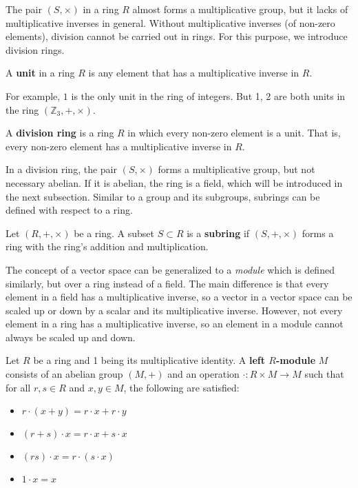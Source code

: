 \documentclass[../main.tex]{subfiles}
\begin{document}
The pair $(S, \times)$ in a ring $R$ almost forms a multiplicative group, but it lacks of multiplicative inverses in general. Without multiplicative inverses (of non-zero elements), division cannot be carried out in rings. For this purpose, we introduce division rings. 
\begin{definition}
A \textbf{unit} in a ring $R$ is any element that has a multiplicative inverse in $R$.
\end{definition}
For example, $1$ is the only unit in the ring of integers. But 1, 2 are both units in the ring $(\mathbb{Z}_3,+,\times)$. 

\begin{definition}
A \textbf{division ring}\reversemarginpar
{}
 is a ring $R$ in which every non-zero element is a unit. That is, every non-zero element has a multiplicative inverse in $R$. 
\end{definition}

In a division ring, the pair $(S, \times)$ forms a multiplicative group, but not necessary abelian. If it is abelian, the ring is a field, which will be introduced in the next subsection. Similar to a group and its subgroups, subrings can be defined with respect to a ring. 

\begin{definition}
Let $(R,+,\times)$ be a ring. A subset $S \subset R$ is a \textbf{subring} if $(S,+,\times)$ forms a ring with the ring's addition and multiplication.
\end{definition}

The concept of a vector space can be generalized to a \textit{module} which is defined similarly, but over a ring instead of a field. The main difference is that every element in a field has a multiplicative inverse, so a vector in a vector space can be scaled up or down by a scalar and its multiplicative inverse. However, not every element in a ring has a multiplicative inverse, so an element in a module cannot always be scaled up and down. 

\begin{definition}
Let $R$ be a ring and 1 being its multiplicative identity. A \textbf{left $R$-module} $M$ \reversemarginpar
{}
consists of an abelian group $(M, +)$ and an operation $\cdot: R \times M \rightarrow M$ such that for all $r,s \in R$ and $x,y\in M$, the following are satisfied:
\begin{itemize}
    \item $r \cdot (x+y) = r\cdot x + r \cdot y$
    \item $(r + s) \cdot x = r \cdot x + s \cdot x$
    \item $(rs) \cdot x = r \cdot (s \cdot x)$
    \item $1 \cdot x = x$
\end{itemize}
\end{definition}
\end{document}

